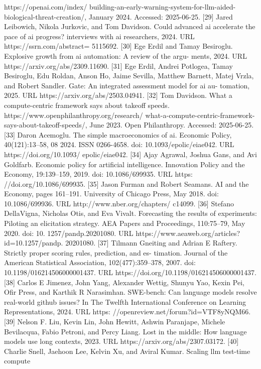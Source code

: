 https://openai.com/index/
building-an-early-warning-system-for-llm-aided-biological-threat-creation/,
January 2024. Accessed: 2025-06-25.
[29] Jared Leibowich, Nikola Jurkovic, and Tom Davidson. Could advanced ai accelerate the pace
of ai progress? interviews with ai researchers, 2024. URL https://ssrn.com/abstract=
5115692.
[30] Ege Erdil and Tamay Besiroglu. Explosive growth from ai automation: A review of the argu-
ments, 2024. URL https://arxiv.org/abs/2309.11690.
[31] Ege Erdil, Andrei Potlogea, Tamay Besiroglu, Edu Roldan, Anson Ho, Jaime Sevilla, Matthew
Barnett, Matej Vrzla, and Robert Sandler. Gate: An integrated assessment model for ai au-
tomation, 2025. URL https://arxiv.org/abs/2503.04941.
[32] Tom
Davidson.
What
a
compute-centric
framework
says
about
takeoff
speeds.
https://www.openphilanthropy.org/research/
what-a-compute-centric-framework-says-about-takeoff-speeds/,
June
2023.
Open Philanthropy. Accessed: 2025-06-25.
[33] Daron Acemoglu. The simple macroeconomics of ai. Economic Policy, 40(121):13–58, 08
2024. ISSN 0266-4658. doi: 10.1093/epolic/eiae042. URL https://doi.org/10.1093/
epolic/eiae042.
[34] Ajay Agrawal, Joshua Gans, and Avi Goldfarb. Economic policy for artificial intelligence.
Innovation Policy and the Economy, 19:139–159, 2019. doi: 10.1086/699935. URL https:
//doi.org/10.1086/699935.
[35] Jason Furman and Robert Seamans.
AI and the Economy, pages 161–191.
University of
Chicago Press, May 2018. doi: 10.1086/699936. URL http://www.nber.org/chapters/
c14099.
[36] Stefano DellaVigna, Nicholas Otis, and Eva Vivalt. Forecasting the results of experiments:
Piloting an elicitation strategy. AEA Papers and Proceedings, 110:75–79, May 2020. doi: 10.
1257/pandp.20201080. URL https://www.aeaweb.org/articles?id=10.1257/pandp.
20201080.
[37] Tilmann Gneiting and Adrian E Raftery. Strictly proper scoring rules, prediction, and es-
timation.
Journal of the American Statistical Association, 102(477):359–378, 2007.
doi:
10.1198/016214506000001437. URL https://doi.org/10.1198/016214506000001437.
[38] Carlos E Jimenez, John Yang, Alexander Wettig, Shunyu Yao, Kexin Pei, Ofir Press, and
Karthik R Narasimhan. SWE-bench: Can language models resolve real-world github issues?
In The Twelfth International Conference on Learning Representations, 2024. URL https:
//openreview.net/forum?id=VTF8yNQM66.
[39] Nelson F. Liu, Kevin Lin, John Hewitt, Ashwin Paranjape, Michele Bevilacqua, Fabio Petroni,
and Percy Liang. Lost in the middle: How language models use long contexts, 2023. URL
https://arxiv.org/abs/2307.03172.
[40] Charlie Snell, Jaehoon Lee, Kelvin Xu, and Aviral Kumar. Scaling llm test-time compute
